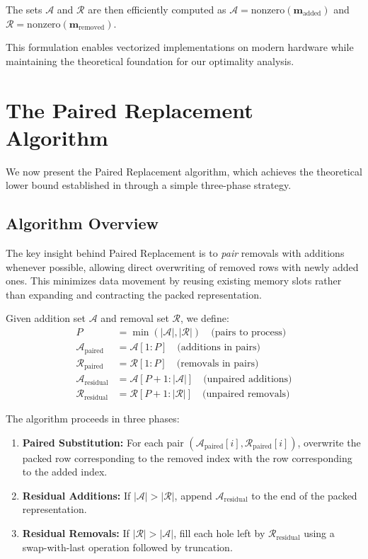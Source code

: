 \documentclass{article}
\numberwithin{equation}{section}
\theoremstyle{plain}
\theoremstyle{definition}
\theoremstyle{remark}
\begin{document}
The sets $\mathcal{A}$ and $\mathcal{R}$ are then efficiently computed as $\mathcal{A} = \text{nonzero}(\mathbf{m}_{\text{added}})$ and $\mathcal{R} = \text{nonzero}(\mathbf{m}_{\text{removed}})$.

This formulation enables vectorized implementations on modern hardware while maintaining the theoretical foundation for our optimality analysis.

\section{The Paired Replacement Algorithm} \label{sec:algorithm}

We now present the Paired Replacement algorithm, which achieves the theoretical lower bound established in  through a simple three-phase strategy.

\subsection{Algorithm Overview}

The key insight behind Paired Replacement is to \emph{pair} removals with additions whenever possible, allowing direct overwriting of removed rows with newly added ones. This minimizes data movement by reusing existing memory slots rather than expanding and contracting the packed representation.

Given addition set $\mathcal{A}$ and removal set $\mathcal{R}$, we define:
\begin{align}
P &= \min(|\mathcal{A}|, |\mathcal{R}|) \quad \text{(pairs to process)} \\
\mathcal{A}_{\text{paired}} &= \mathcal{A}[1:P] \quad \text{(additions in pairs)} \\
\mathcal{R}_{\text{paired}} &= \mathcal{R}[1:P] \quad \text{(removals in pairs)} \\
\mathcal{A}_{\text{residual}} &= \mathcal{A}[P+1:|\mathcal{A}|] \quad \text{(unpaired additions)} \\
\mathcal{R}_{\text{residual}} &= \mathcal{R}[P+1:|\mathcal{R}|] \quad \text{(unpaired removals)}
\end{align}

The algorithm proceeds in three phases:

\begin{enumerate}
    \item \textbf{Paired Substitution:} For each pair $(\mathcal{A}_{\text{paired}}[i], \mathcal{R}_{\text{paired}}[i])$, overwrite the packed row corresponding to the removed index with the row corresponding to the added index.
    
    \item \textbf{Residual Additions:} If $|\mathcal{A}| > |\mathcal{R}|$, append $\mathcal{A}_{\text{residual}}$ to the end of the packed representation.
    
    \item \textbf{Residual Removals:} If $|\mathcal{R}| > |\mathcal{A}|$, fill each hole left by $\mathcal{R}_{\text{residual}}$ using a swap-with-last operation followed by truncation.
\end{enumerate}
\end{document}
